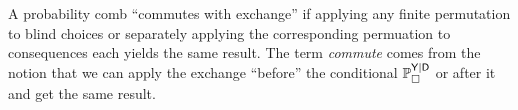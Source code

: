 




A probability comb ``commutes with exchange'' if applying any finite permutation to blind choices or separately applying the corresponding permuation to consequences each yields the same result. The term \emph{commute} comes from the notion that we can apply the exchange ``before'' the conditional $\mathbb{P}_{\square}^{\mathsf{Y}|\mathsf{D}}$ or after it and get the same result.

